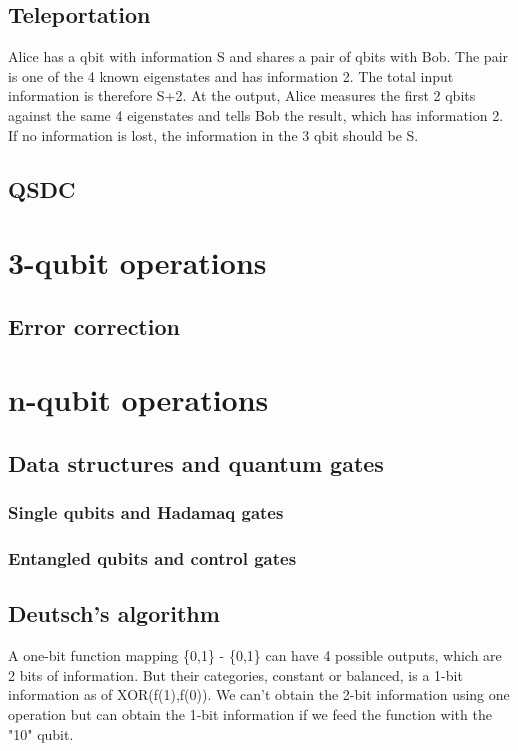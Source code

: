 \documentclass{book}
\begin{document}
\section{Teleportation}
Alice has a qbit with information S and shares a pair of qbits with Bob. The pair is one of the 4 known eigenstates and has information 2. The total input information is therefore S+2. At the output, Alice measures the first 2 qbits against the same 4 eigenstates and tells Bob the result, which has information 2. If no information is lost, the information in the 3 qbit should be S.

\section{QSDC}

\chapter{3-qubit operations}
\section{Error correction}

\chapter{n-qubit operations}
\section{Data structures and quantum gates}
\subsection{Single qubits and Hadamaq gates}
\subsection{Entangled qubits and control gates}
\section{Deutsch's algorithm}
A one-bit function mapping \{0,1\} -\> \{0,1\} can have 4 possible outputs, which are 2 bits of information. But their categories, constant or balanced, is a 1-bit information as of XOR(f(1),f(0)). We can't obtain the 2-bit information using one operation but can obtain the 1-bit information if we feed the function with the "10" qubit.
\end{document}
